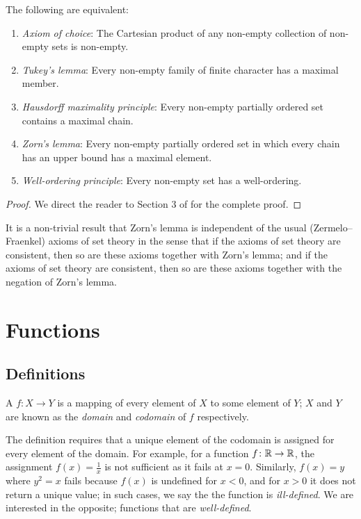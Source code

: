 \begin{theorem}
The following are equivalent:
\begin{enumerate}[label=(\roman*)]
\item \emph{Axiom of choice}: The Cartesian product of any non-empty collection of non-empty sets is non-empty.
\item \emph{Tukey's lemma}: Every non-empty family of finite character has a maximal member.
\item \emph{Hausdorff maximality principle}: Every non-empty partially ordered set contains a maximal chain.
\item \emph{Zorn's lemma}: Every non-empty partially ordered set in which every chain has an upper bound has a maximal element.
\item \emph{Well-ordering principle}: Every non-empty set has a well-ordering.
\end{enumerate}
\end{theorem}

\begin{proof}
We direct the reader to Section 3 of \cite{hewitt-stromberg} for the complete proof.
\end{proof}

\begin{remark}
It is a non-trivial result that Zorn's lemma is independent of the usual (Zermelo--Fraenkel) axioms of set theory in the sense that if the axioms of set theory are consistent, then so are these axioms together with Zorn's lemma; and if the axioms of set theory are consistent, then so are these axioms together with the negation of Zorn's lemma.
\end{remark}
\pagebreak

\section{Functions}
\subsection{Definitions}
\begin{definition}[Function]
A  $f\colon X\to Y$ is a mapping of every element of $X$ to some element of $Y$; $X$ and $Y$ are known as the \emph{domain} and \emph{codomain} of $f$ respectively.
\end{definition}

\begin{remark}
The definition requires that a unique element of the codomain is assigned for every element of the domain. For example, for a function $f\colon \mathbb R \to \mathbb R$, the assignment $f(x)=\frac{1}{x}$ is not sufficient as it fails at $x=0$. Similarly, $f(x)=y$ where $y^2=x$ fails because $f(x)$ is undefined for $x<0$, and for $x>0$ it does not return a unique value; in such cases, we say the the function is \emph{ill-defined}. We are interested in the opposite; functions that are \emph{well-defined}.
\end{remark}

